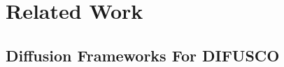 \section{Related Work}
\label{sec:RelatedWork}





\subsection{Diffusion Frameworks For DIFUSCO}


